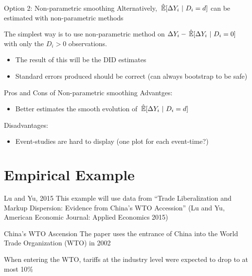 \documentclass[aspectratio=43,t]{beamer}
\begin{document}
\begin{frame}{Option 2: Non-parametric smoothing}
  Alternatively, $\expechat{\Delta Y_i}{D_i = d}$ can be estimated with non-parametric methods

  \bigskip
  The simplest way is to use non-parametric method on $\Delta Y_i - \expechat{\Delta Y_i}{D_i = 0}$ with only the $D_i > 0$ observations.
  \begin{itemize}
    \item The result of this will be the DID estimates

    \item Standard errors produced should be correct (can always bootstrap to be safe)
  \end{itemize}
\end{frame}


\begin{frame}{Pros and Cons of Non-parametric smoothing}
  Advantges:
  \begin{itemize}
    \item Better estimates the smooth evolution of $\expechat{\Delta Y_i}{D_i = d}$
  \end{itemize}

  \bigskip
  Disadvantages:
  \begin{itemize}
    \item Event-studies are hard to display (one plot for each event-time?)
  \end{itemize}
\end{frame}


\section{Empirical Example}

\begin{frame}{Lu and Yu, 2015}
  This example will use data from
  ``Trade Liberalization and Markup Dispersion: Evidence from China's WTO Accession'' (Lu and Yu, American Economic Journal: Applied Economics 2015)
\end{frame}

\begin{frame}{China's WTO Ascension}
  The paper uses the entrance of China into the World Trade Organization (WTO) in 2002

  \bigskip
  When entering the WTO, tariffs at the industry level were expected to drop to at most 10\%
\end{frame}
\end{document}

